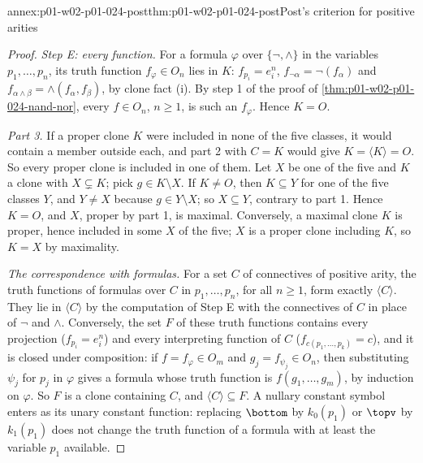 \begin{annexitem}{annex:p01-w02-p01-024-post}{thm:p01-w02-p01-024-post}{Post's criterion for positive arities}
\begin{proof}
\emph{Step E: every function.}  For a formula \(\varphi\) over
\(\{\neg,\land\}\) in the variables \(p_1,\ldots,p_n\), its truth function
\(f_\varphi\in O_n\) lies in \(K\): \(f_{p_i}=e^n_i\),
\(f_{\neg\alpha}=\neg(f_\alpha)\) and
\(f_{\alpha\land\beta}=\land(f_\alpha,f_\beta)\), by clone fact (i).  By
step 1 of the proof of \cref{thm:p01-w02-p01-024-nand-nor}, every
\(f\in O_n\), \(n\geq1\), is such an \(f_\varphi\).  Hence \(K=O\).

\emph{Part 3.}  If a proper clone \(K\) were included in none of the five
classes, it would contain a member outside each, and part 2 with \(C=K\)
would give \(K=\langle K\rangle=O\).  So every proper clone is included in
one of them.  Let \(X\) be one of the five and \(K\) a clone with
\(X\subsetneq K\); pick \(g\in K\setminus X\).  If \(K\neq O\), then
\(K\subseteq Y\) for one of the five classes \(Y\), and \(Y\neq X\) because
\(g\in Y\setminus X\); so \(X\subseteq Y\), contrary to part 1.  Hence
\(K=O\), and \(X\), proper by part 1, is maximal.  Conversely, a maximal
clone \(K\) is proper, hence included in some \(X\) of the five; \(X\) is a
proper clone including \(K\), so \(K=X\) by maximality.

\emph{The correspondence with formulas.}  For a set \(C\) of connectives of
positive arity, the truth functions of formulas over \(C\) in
\(p_1,\ldots,p_n\), for all \(n\geq1\), form exactly \(\langle C\rangle\).
They lie in \(\langle C\rangle\) by the computation of Step E with the
connectives of \(C\) in place of \(\neg\) and \(\land\).  Conversely, the
set \(F\) of these truth functions contains every projection
(\(f_{p_i}=e^n_i\)) and every interpreting function of \(C\)
(\(f_{c(p_1,\ldots,p_k)}=c\)), and it is closed under composition: if
\(f=f_\varphi\in O_m\) and \(g_j=f_{\psi_j}\in O_n\), then substituting
\(\psi_j\) for \(p_j\) in \(\varphi\) gives a formula whose truth function
is \(f(g_1,\ldots,g_m)\), by induction on \(\varphi\).  So \(F\) is a clone
containing \(C\), and \(\langle C\rangle\subseteq F\).  A nullary constant
symbol enters as its unary constant function: replacing \(\bottom\) by
\(k_0(p_1)\) or \(\topv\) by \(k_1(p_1)\) does not change the truth
function of a formula with at least the variable \(p_1\) available.
\end{proof}
\end{annexitem}
